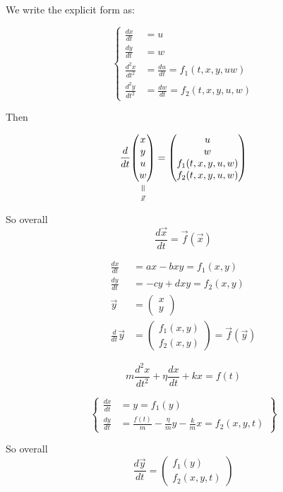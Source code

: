 \documentclass[10pt]{scrartcl}
\begin{document}
We write the explicit form as: 

\[
\left\{
\begin{aligned}
  \frac{dx}{dt} &= u\\
  \frac{dy}{dt} &= w\\
  \frac{d^2x}{dt^2} &= \frac{du}{dt} = f_1(t, x, y, u w)\\
  \frac{d^2y}{dt^2} &= \frac{dw}{dt} = f_2(t,x,y,u,w)
\end{aligned}
\right. \]

Then 

\[\frac{d}{dt}\equalto{\begin{pmatrix}
x \\ y \\ u \\ w	
\end{pmatrix}}{\vec{x}}
= \begin{pmatrix}
 u \\ w\\ 
 f_1(t,x,y,u,w)\\
 f_2(t,x,y,u,w)	
 \end{pmatrix}
\]

So overall 
\[\boxed{\frac{d\vec{x}}{dt} = \vec{f}(\vec{x}) }\]\vspace*{5pt}


\begin{example}
\[
\begin{aligned}
  \frac{dx}{dt} &= ax - bxy = f_1(x,y)\\
  \frac{dy}{dt} &= -cy + dxy = f_2(x,y)\\
  \vec{y} &= \begin{pmatrix} x \\ y \end{pmatrix}\\
  \frac{d}{dt}\vec{y} &= \begin{pmatrix}
 f_1(x,y) \\ f_2(x,y)	
 \end{pmatrix} = \vec{f}(\vec{y})
\end{aligned}
\]	
\end{example}

\begin{example}
\[m\frac{d^2x}{dt^2} + \eta \frac{dx}{dt} + kx = f(t)\]

\[\left\{
\begin{aligned}
  \frac{dx}{dt} &= y = f_1(y)\\
  \frac{dy}{dt} &= \frac{f(t)}{m} - \frac{\eta}{m}y  -\frac{k}{m}x = f_2(x,y,t)
\end{aligned}\right\}
\]

So overall 
\[\frac{d\vec{y}}{dt} = \begin{pmatrix}
 f_1(y) \\ f_2(x,y,t)	
 \end{pmatrix}
\]
	
\end{example}
\end{document}
